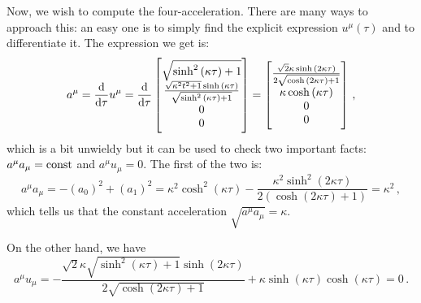 \documentclass[main.tex]{subfiles}
\begin{document}
Now, we wish to compute the four-acceleration. There are many ways to approach this: an easy one is to simply find the explicit expression \(u^{\mu } (\tau )\) and to differentiate it. The expression we get is:
%
\begin{equation}
    a^{\mu } = \dv{}{\tau } u^{\mu } = \dv{}{\tau }   
  \begin{bmatrix}
    \sqrt{\sinh^{2}{\left(\kappa \tau \right)} + 1}
        \\
    \frac{\sqrt{\kappa^{2} t^{2} + 1} \sinh{\left(\kappa \tau \right)}}{\sqrt{\sinh^{2}{\left(\kappa \tau \right)} + 1}} \\
    0 \\
    0
  \end{bmatrix}
  =
  \begin{bmatrix}
    \frac{\sqrt{2} \kappa \sinh{\left(2 \kappa \tau \right)}}{2 \sqrt{\cosh{\left(2 \kappa \tau \right)} + 1}}
    \\
    \kappa \cosh \left(\kappa \tau \right)\\
    0 \\
    0
  \end{bmatrix}
\,,
\end{equation}
%
which is a bit unwieldy but it can be used to check two important facts: \(a^{\mu } a_{\mu } = \text{const} \) and \(a^{\mu }u_{\mu } = 0\). The first of the two is:
%
\begin{equation}
    a^{\mu }a_{\mu } = -(a_0 )^2 + (a_1 )^2 =
    \kappa^{2} \cosh^{2}{\left(\kappa \tau \right)} - \frac{\kappa^{2} \sinh^{2}{\left(2 \kappa \tau \right)}}{2 \left(\cosh{\left(2 \kappa \tau \right)} + 1\right)}
    = \kappa^2 
\,,
\end{equation}
%
which tells us that the constant acceleration \(\sqrt{a^{\mu }a_{\mu }} = \kappa \).

On the other hand, we have 
%
\begin{equation}
  a^{\mu }u_{\mu } = 
  - \frac{\sqrt{2} \kappa \sqrt{\sinh^{2}{\left(\kappa \tau \right)} + 1} \sinh{\left(2 \kappa \tau \right)}}{2 \sqrt{\cosh{\left(2 \kappa \tau \right)} + 1}} + \kappa \sinh{\left(\kappa \tau \right)} \cosh{\left(\kappa \tau \right)}
  = 0
\,.
\end{equation}
%
\end{document}
